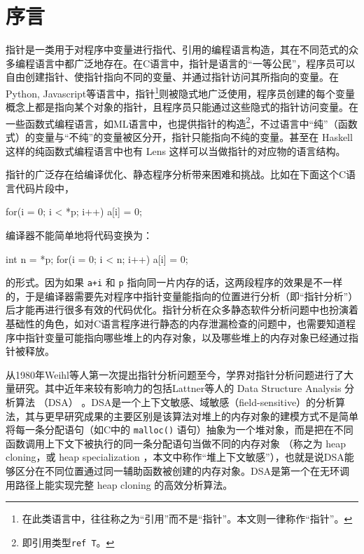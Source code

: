 
\chapter{序言}

指针是一类用于对程序中变量进行指代、引用的编程语言构造，其在不同范式的众多编程语言中都广泛地存在。在C语言中，指针是语言的“一等公民”，程序员可以自由创建指针、使指针指向不同的变量、并通过指针访问其所指向的变量。在Python, Javascript等语言中，指针\footnote{在此类语言中，往往称之为“引用”而不是“指针”。本文则一律称作“指针”。}则被隐式地广泛使用，程序员创建的每个变量概念上都是指向某个对象的指针，且程序员只能通过这些隐式的指针访问变量。在一些函数式编程语言，如ML语言中，也提供指针的构造\footnote{即引用类型\texttt{ref T}。}，不过语言中“纯”（函数式）的变量与“不纯”的变量被区分开，指针只能指向不纯的变量。甚至在 Haskell 这样的纯函数式编程语言中也有 Lens \supercite{Foster2007} 这样可以当做指针的对应物的语言结构。

指针的广泛存在给编译优化、静态程序分析带来困难和挑战。比如在下面这个C语言代码片段中，


\begin{CVerbatim}
for(i = 0; i < *p; i++) {
    a[i] = 0;
}	
\end{CVerbatim}		
编译器不能简单地将代码变换为：
\begin{CVerbatim}
int n = *p;
for(i = 0; i < n; i++) {
    a[i] = 0;
}	
\end{CVerbatim}		
的形式。因为如果 \verb|a+i| 和 \verb|p| 指向同一片内存的话，这两段程序的效果是不一样的，于是编译器需要先对程序中指针变量能指向的位置进行分析（即“指针分析”）后才能再进行很多有效的代码优化。指针分析在众多静态软件分析问题中也扮演着基础性的角色，如对C语言程序进行静态的内存泄漏检查的问题中，也需要知道程序中指针变量可能指向哪些堆上的内存对象，以及哪些堆上的内存对象已经通过指针被释放。

从1980年Weihl等人第一次提出指针分析问题\supercite{weihl1980interprocedural}至今，学界对指针分析问题进行了大量研究。其中近年来较有影响力的包括Lattner等人的 Data Structure Analysis 分析算法 （DSA） \supercite{Lattner2007}。DSA是一个上下文敏感、域敏感（field-sensitive）的分析算法，其与更早研究成果的主要区别是该算法对堆上的内存对象的建模方式不是简单将每一条分配语句（如C中的 \verb|malloc()| 语句）抽象为一个堆对象，而是把在不同函数调用上下文下被执行的同一条分配语句当做不同的内存对象 （称之为 heap cloning，或 heap specialization \supercite{nystrom2004importance}，本文中称作“堆上下文敏感”），也就是说DSA能够区分在不同位置通过同一辅助函数被创建的内存对象。DSA是第一个在无环调用路径上能实现完整 heap cloning 的高效分析算法。

